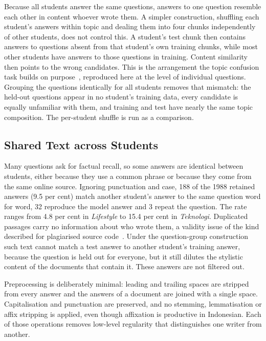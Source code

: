 \documentclass[conference]{IEEEtran}
\begin{document}
Because all students answer the same questions, answers to one question resemble each other in content whoever wrote them. A simpler construction, shuffling each student's answers within topic and dealing them into four chunks independently of other students, does not control this. A student's test chunk then contains answers to questions absent from that student's own training chunks, while most other students have answers to those questions in training. Content similarity then points to the wrong candidates. This is the arrangement the topic confusion task builds on purpose~\cite{Altakrori2021}, reproduced here at the level of individual questions. Grouping the questions identically for all students removes that mismatch: the held-out questions appear in no student's training data, every candidate is equally unfamiliar with them, and training and test have nearly the same topic composition. The per-student shuffle is run as a comparison.

\subsection{Shared Text across Students}

Many questions ask for factual recall, so some answers are identical between students, either because they use a common phrase or because they come from the same online source. Ignoring punctuation and case, 188 of the 1988 retained answers (9.5 per cent) match another student's answer to the same question word for word, 32 reproduce the model answer and 3 repeat the question. The rate ranges from 4.8 per cent in \textit{Lifestyle} to 15.4 per cent in \textit{Teknologi}. Duplicated passages carry no information about who wrote them, a validity issue of the kind described for plagiarised source code~\cite{Bogomolov2021}. Under the question-group construction such text cannot match a test answer to another student's training answer, because the question is held out for everyone, but it still dilutes the stylistic content of the documents that contain it. These answers are not filtered out.

Preprocessing is deliberately minimal: leading and trailing spaces are stripped from every answer and the answers of a document are joined with a single space. Capitalisation and punctuation are preserved, and no stemming, lemmatisation or affix stripping is applied, even though affixation is productive in Indonesian. Each of those operations removes low-level regularity that distinguishes one writer from another.
\end{document}
